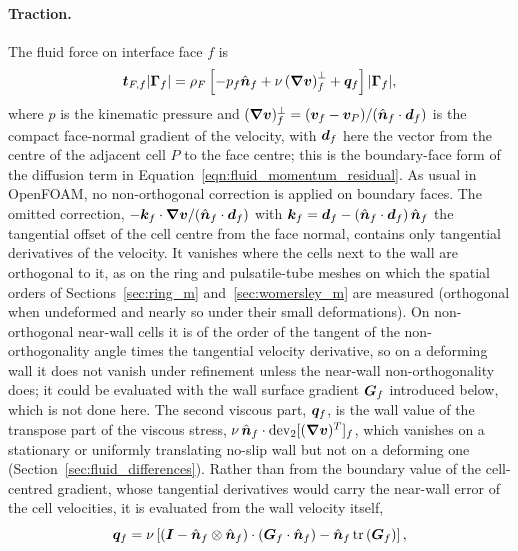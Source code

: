 \paragraph{Traction.}
The fluid force on interface face $f$ is
\begin{equation}
    \boldsymbol{t}_{F,f} |\boldsymbol{\Gamma}_f|
    =
    \rho_F
    \left[
    - p_f \hat{\boldsymbol{n}}_f
    +
    \nu
    \left(\boldsymbol{\nabla}\boldsymbol{v}\right)^{\perp}_f
    +
    \boldsymbol{q}_f
    \right]
    |\boldsymbol{\Gamma}_f|,
    \label{eqn:interface_fluid_traction}
\end{equation}
where $p$ is the kinematic pressure and $(\boldsymbol{\nabla}\boldsymbol{v})^{\perp}_f = (\boldsymbol{v}_f - \boldsymbol{v}_P)/(\hat{\boldsymbol{n}}_f \cdot \boldsymbol{d}_f)$ is the compact face-normal gradient of the velocity, with $\boldsymbol{d}_f$ here the vector from the centre of the adjacent cell $P$ to the face centre; this is the boundary-face form of the diffusion term in Equation~\eqref{eqn:fluid_momentum_residual}.
As usual in OpenFOAM, no non-orthogonal correction is applied on boundary faces.
The omitted correction, $-\boldsymbol{k}_f\cdot\boldsymbol{\nabla}\boldsymbol{v}/(\hat{\boldsymbol{n}}_f\cdot\boldsymbol{d}_f)$ with $\boldsymbol{k}_f = \boldsymbol{d}_f - (\hat{\boldsymbol{n}}_f\cdot\boldsymbol{d}_f)\,\hat{\boldsymbol{n}}_f$ the tangential offset of the cell centre from the face normal, contains only tangential derivatives of the velocity.
It vanishes where the cells next to the wall are orthogonal to it, as on the ring and pulsatile-tube meshes on which the spatial orders of Sections~\ref{sec:ring_m} and~\ref{sec:womersley_m} are measured (orthogonal when undeformed and nearly so under their small deformations).
On non-orthogonal near-wall cells it is of the order of the tangent of the non-orthogonality angle times the tangential velocity derivative, so on a deforming wall it does not vanish under refinement unless the near-wall non-orthogonality does; it could be evaluated with the wall surface gradient $\boldsymbol{G}_f$ introduced below, which is not done here.
The second viscous part, $\boldsymbol{q}_f$, is the wall value of the transpose part of the viscous stress, $\nu\,\hat{\boldsymbol{n}}_f \cdot \mathrm{dev}_2[(\boldsymbol{\nabla}\boldsymbol{v})^T]_f$, which vanishes on a stationary or uniformly translating no-slip wall but not on a deforming one (Section~\ref{sec:fluid_differences}).
Rather than from the boundary value of the cell-centred gradient, whose tangential derivatives would carry the near-wall error of the cell velocities, it is evaluated from the wall velocity itself,
\begin{equation}
    \boldsymbol{q}_f
    =
    \nu
    \left[
    \left(\boldsymbol{I} - \hat{\boldsymbol{n}}_f\otimes\hat{\boldsymbol{n}}_f\right)\cdot\left(\boldsymbol{G}_f \cdot \hat{\boldsymbol{n}}_f\right)
    -
    \hat{\boldsymbol{n}}_f\, \mathrm{tr}\left(\boldsymbol{G}_f\right)
    \right],
    \label{eqn:interface_transpose_traction}
\end{equation}
